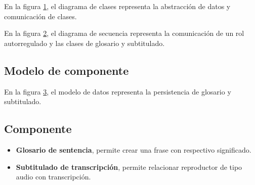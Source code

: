 En la figura \ref{fig:Diagrama de clases para glosario y subtitulado},
el diagrama de clases representa la abstracción de datos y comunicación
de clases.

\begin{figure}[!ht]
	\centering
	\label{fig:Diagrama de clases para glosario y subtitulado}
\end{figure}

En la figura \ref{fig:Diagrama de secuencia para glosario y subtitulado},
el diagrama de secuencia representa la comunicación de un rol autorregulado
y las clases de glosario y subtitulado.

\begin{figure}[H]
	\centering
	\label{fig:Diagrama de secuencia para glosario y subtitulado}
\end{figure}

\subsection{Modelo de componente}

En la figura \ref{fig:Modelo de datos para glosario y subtitulado}, el modelo
de datos representa la persistencia de glosario y subtitulado.

\begin{figure}[!ht]
	\centering
	\label{fig:Modelo de datos para glosario y subtitulado}
\end{figure}

\subsection{Componente}

\begin{itemize}

\item \textbf{Glosario de sentencia}, permite crear una frase con respectivo
significado.
\item \textbf{Subtitulado de transcripción}, permite relacionar reproductor
de tipo audio con transcripción.

\end{itemize}


